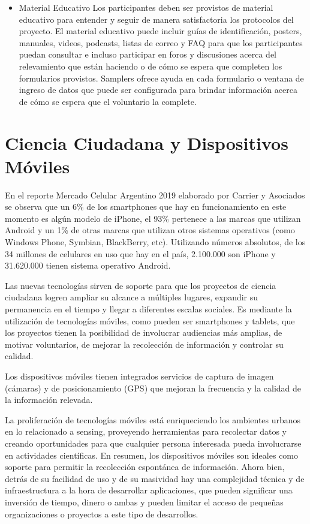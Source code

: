 \begin{itemize}
	\item {Material Educativo}
		Los participantes deben ser provistos de material educativo para entender y seguir de manera satisfactoria los protocolos del proyecto. El material educativo puede incluir guías de identificación, posters, manuales, videos, podcasts, listas de correo y FAQ para que los participantes puedan consultar e incluso participar en foros y discusiones acerca del relevamiento que están haciendo o de cómo se espera que completen los formularios provistos. 
		Samplers ofrece ayuda en cada formulario o ventana de ingreso de datos que puede ser configurada para brindar información acerca de cómo se espera que el voluntario la complete.
		
\end{itemize} 

	
\section{Ciencia Ciudadana y Dispositivos Móviles}

	En el reporte Mercado Celular Argentino 2019 elaborado por Carrier y Asociados se observa que un 6\% de los smartphones que hay en funcionamiento en este momento es algún modelo de iPhone, el 93\% pertenece a las marcas que utilizan Android y un 1\% de otras marcas que utilizan otros sistemas operativos (como Windows Phone, Symbian, BlackBerry, etc). Utilizando números absolutos, de los 34 millones de celulares en uso que hay en el país, 2.100.000 son iPhone y 31.620.000 tienen sistema operativo Android. \cite{carrier}		

	
	Las nuevas tecnologías sirven de soporte para que los proyectos de ciencia ciudadana logren ampliar su alcance a múltiples lugares, expandir su permanencia en el tiempo y llegar a diferentes escalas sociales. Es mediante la utilización de tecnologías móviles, como pueden ser smartphones y tablets, que los proyectos tienen la posibilidad de involucrar audiencias más amplias, de motivar voluntarios, de mejorar la recolección de información y controlar su calidad.\cite{newman2012future}
	
	

	Los dispositivos móviles tienen integrados servicios de captura de imagen (cámaras) y de posicionamiento (GPS) que mejoran la frecuencia y la calidad de la información relevada.\cite{newman2012future}
	
	La proliferación de tecnologías móviles está enriqueciendo los ambientes urbanos en lo relacionado a sensing, proveyendo herramientas para recolectar datos y creando oportunidades para que cualquier persona interesada pueda involucrarse en actividades científicas. En resumen, los dispositivos móviles son ideales como soporte para permitir la recolección espontánea de información. Ahora bien, detrás de su facilidad de uso y de su masividad hay una complejidad técnica y de infraestructura a la hora de desarrollar aplicaciones, que pueden significar una inversión de tiempo, dinero o ambas y pueden limitar el acceso de pequeñas organizaciones o proyectos a este tipo de desarrollos. \cite{kim2013sensr}
	
	
	
	


